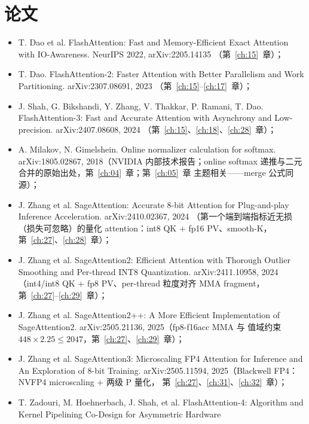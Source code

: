 \section{论文}

\begin{itemize}
  \item T. Dao et al. FlashAttention: Fast and Memory-Efficient Exact
        Attention with IO-Awareness. NeurIPS 2022, arXiv:2205.14135
        （第~\ref{ch:15}~章）；
  \item T. Dao. FlashAttention-2: Faster Attention with Better Parallelism
        and Work Partitioning. arXiv:2307.08691, 2023
        （第~\ref{ch:15}--\ref{ch:17}~章）；
  \item J. Shah, G. Bikshandi, Y. Zhang, V. Thakkar, P. Ramani, T. Dao.
        FlashAttention-3: Fast and Accurate Attention with Asynchrony and
        Low-precision. arXiv:2407.08608, 2024
        （第~\ref{ch:15}、\ref{ch:18}、\ref{ch:28}~章）；
  \item A. Milakov, N. Gimelshein. Online normalizer calculation for
        softmax. arXiv:1805.02867, 2018（NVIDIA 内部技术报告；online
        softmax 递推与二元合并的原始出处，第~\ref{ch:04}~章；第~\ref{ch:05}~章
        主题相关——merge 公式同源）；
  \item J. Zhang et al. SageAttention: Accurate 8-bit Attention for
        Plug-and-play Inference Acceleration. arXiv:2410.02367, 2024
        （第一个端到端指标近无损（损失可忽略）的量化 attention：int8 QK +
        fp16 PV、smooth-K，第~\ref{ch:27}、\ref{ch:28}~章）；
  \item J. Zhang et al. SageAttention2: Efficient Attention with Thorough
        Outlier Smoothing and Per-thread INT8 Quantization. arXiv:2411.10958,
        2024（int4/int8 QK + fp8 PV、per-thread 粒度对齐 MMA fragment，
        第~\ref{ch:27}--\ref{ch:29}~章）；
  \item J. Zhang et al. SageAttention2++: A More Efficient Implementation
        of SageAttention2. arXiv:2505.21136, 2025（fp8-f16acc MMA 与
        值域约束 $448\times2.25\le2047$，第~\ref{ch:27}、\ref{ch:29}~章）；
  \item J. Zhang et al. SageAttention3: Microscaling FP4 Attention for
        Inference and An Exploration of 8-bit Training. arXiv:2505.11594,
        2025（Blackwell FP4：NVFP4 microscaling + 两级 P 量化，
        第~\ref{ch:27}、\ref{ch:31}、\ref{ch:32}~章）；
  \item T. Zadouri, M. Hoehnerbach, J. Shah, et al. FlashAttention-4:
        Algorithm and Kernel Pipelining Co-Design for Asymmetric Hardware

\end{itemize}
